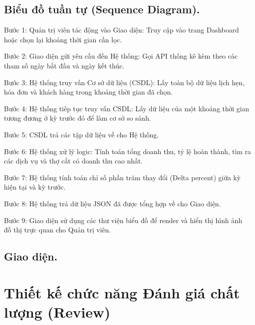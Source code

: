 \documentclass[../BTL.tex]{subfiles}
\begin{document}
\subsection{Biểu đồ tuần tự (Sequence Diagram).}

Bước 1: Quản trị viên tác động vào Giao diện: Truy cập vào trang Dashboard hoặc chọn lại khoảng thời gian cần lọc.

Bước 2: Giao diện gửi yêu cầu đến Hệ thống: Gọi API thống kê kèm theo các tham số ngày bắt đầu và ngày kết thúc.

Bước 3: Hệ thống truy vấn Cơ sở dữ liệu (CSDL): Lấy toàn bộ dữ liệu lịch hẹn, hóa đơn và khách hàng trong khoảng thời gian đã chọn.

Bước 4: Hệ thống tiếp tục truy vấn CSDL: Lấy dữ liệu của một khoảng thời gian tương đương ở kỳ trước đó để làm cơ sở so sánh.

Bước 5: CSDL trả các tập dữ liệu về cho Hệ thống.

Bước 6: Hệ thống xử lý logic: Tính toán tổng doanh thu, tỷ lệ hoàn thành, tìm ra các dịch vụ và thợ cắt có doanh thu cao nhất. 

Bước 7: Hệ thống tính toán chỉ số phần trăm thay đổi (Delta percent) giữa kỳ hiện tại và kỳ trước.

Bước 8: Hệ thống trả dữ liệu JSON đã được tổng hợp về cho Giao diện.

Bước 9: Giao diện sử dụng các thư viện biểu đồ để render và hiển thị hình ảnh đồ thị trực quan cho Quản trị viên.

\subsection{Giao diện.}


\section{Thiết kế chức năng Đánh giá chất lượng (Review)}
\end{document}
